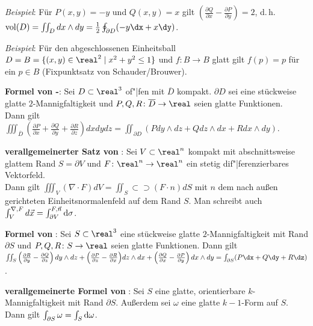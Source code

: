 \emph{Beispiel}:
Für $P(x, y) = -y$ und $Q(x, y) = x$ gilt
$\left(\frac{\partial Q}{\partial x} -
\frac{\partial P}{\partial y}\right) = 2$, d.\,h. \\
$\vol(D) =  \iint_D dx \land dy =
\frac{1}{2} \oint_{\partial D} (-y\dx + x\dy)$.

\emph{Beispiel}:
Für den abgeschlossenen Einheitsball
$D = B = \{(x, y) \in \real^2 \;|\; x^2 + y^2 \le 1\}$ und
$f\colon B \rightarrow B$ glatt gilt
$f(p) = p$ für ein $p \in B$
(Fixpunktsatz von Schauder/Brouwer).

\linie

\textbf{Formel von -}:
Sei $D \subset \real^3$ of"|fen mit $\overline{D}$ kompakt.
$\partial D$ sei eine stückweise glatte $2$-Mannigfaltigkeit und
$P, Q, R\colon \overline{D} \rightarrow \real$ seien glatte Funktionen. \\
Dann gilt $\iiint_{\overline{D}} \left(\frac{\partial P}{\partial x} +
\frac{\partial Q}{\partial y} + \frac{\partial R}{\partial z}\right) dxdydz =
\iint_{\partial D} (Pdy \land dz + Qdz \land dx + Rdx \land dy)$.

\textbf{verallgemeinerter Satz von }:
Sei $V \subset \real^n$ kompakt mit
abschnittsweise glattem Rand $S = \partial V$
und $F\colon \real^n \rightarrow \real^n$ ein stetig dif"|ferenzierbares
Vektorfeld. \\
Dann gilt $\iiint_V (\nabla \cdot F) dV =
\iint_S\!\!\!\!\!\!\!\!\!\!\!\subset\!\supset (F \cdot n) dS$
mit $n$ dem nach außen gerichteten Einheitsnormalenfeld auf dem Rand $S$.
Man schreibt auch $\int_V \sp{\nabla, F} d\vec{x} =
\int_{\partial V} \sp{F, \vec{n}} \mathrm{d}\sigma$.

\linie

\textbf{Formel von }:
Sei $S \subset \real^3$ eine stückweise glatte $2$-Mannigfaltigkeit mit Rand
$\partial S$ und $P, Q, R\colon S \rightarrow \real$ seien glatte Funktionen.
Dann gilt \\
$\iint_S \left(\frac{\partial R}{\partial y} -
\frac{\partial Q}{\partial z}\right) dy \land dz +
\Big(\frac{\partial P}{\partial z} -
\frac{\partial R}{\partial x}\Big) dz \land dx +
\left(\frac{\partial Q}{\partial x} -
\frac{\partial P}{\partial y}\right) dx \land dy =
\int_{\partial S} (P\dx + Q\dy + R\dz)$.

\textbf{verallgemeinerte Formel von }:
Sei $S$ eine glatte, orientierbare $k$-Mannigfaltigkeit mit Rand $\partial S$.
Außerdem sei $\omega$ eine glatte $k - 1$-Form auf $S$. \\
Dann gilt $\int_{\partial S} \omega = \int_S \mathrm{d} \omega$.

